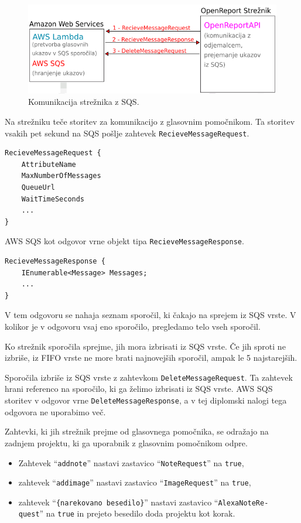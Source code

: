 \documentclass[a4paper, 12pt]{book}
\begin{document}
\begin{figure}[H]
\begin{center}
\includegraphics[width=13cm]{plan_sqs_server}
\end{center}
\caption{Komunikacija strežnika z SQS.}
\label{plan_sqs_server}
\end{figure}


Na strežniku teče storitev za komunikacijo z glasovnim pomočnikom.
Ta storitev vsakih pet sekund na SQS pošlje zahtevek \texttt{RecieveMessageRequest}.

\begin{Verbatim}[commandchars=+\[\]]
RecieveMessageRequest {
    AttributeName 
    MaxNumberOfMessages 
    QueueUrl 
    WaitTimeSeconds
    ... 
} 
\end{Verbatim}

AWS SQS kot odgovor vrne objekt tipa \texttt{RecieveMessageResponse}.

\begin{Verbatim}[commandchars=+\[\]]
RecieveMessageResponse {
    IEnumerable<Message> Messages;
    ...
}
\end{Verbatim}

V tem odgovoru se nahaja seznam sporočil, ki čakajo na sprejem iz SQS vrste.
V kolikor je v odgovoru vsaj eno sporočilo, pregledamo telo vseh sporočil. 

Ko strežnik sporočila sprejme, jih mora izbrisati iz SQS vrste.
Če jih sproti ne izbriše, iz FIFO vrste ne more brati najnovejših sporočil, ampak le 5 najstarejših.

Sporočila izbriše iz SQS vrste z zahtevkom \texttt{DeleteMessageRequest}.
Ta zahtevek hrani referenco na sporočilo, ki ga želimo izbrisati iz SQS vrste.
AWS SQS storitev v odgovor vrne \texttt{DeleteMessageResponse}, a v tej diplomski nalogi tega odgovora ne uporabimo več.

Zahtevki, ki jih strežnik prejme od glasovnega pomočnika, se odražajo na zadnjem projektu, ki ga uporabnik z glasovnim pomočnikom odpre.
\begin{itemize}
	\item Zahtevek \enquote{\texttt{addnote}} nastavi zastavico \enquote{\texttt{NoteRequest}} na \texttt{true},
	\item zahtevek \enquote{\texttt{addimage}} nastavi zastavico \enquote{\texttt{ImageRequest}} na \texttt{true},
	\item zahtevek \enquote{\texttt{\{narekovano besedilo\}}} nastavi zastavico \enquote{\texttt{AlexaNoteRe-\\quest}} na \texttt{true} in prejeto besedilo doda projektu kot korak.
\end{itemize}
\end{document}
